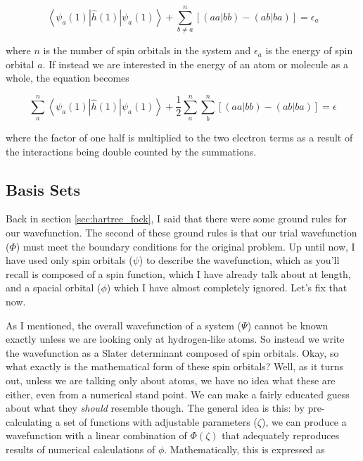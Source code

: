 \documentclass[12pt]{report}
\begin{document}
 \begin{equation}
\label{eq:hartree-fock_eq}
\left<\psi_{a}(1)|\hat{h}(1)|\psi_{a}(1)\right> + \sum^{n}_{b\neq a}\left[\left(aa|bb\right) - \left(ab|ba\right)\right] = \epsilon_{a}
\end{equation}

where $n$ is the number of spin orbitals in the system and $\epsilon_{a}$ is the energy of spin orbital $a$. If instead we are interested in the energy of an atom or molecule as a whole, the equation becomes

 \begin{equation}
\label{eq:hartree-fock_eq}
\sum_{a}^{n}\left<\psi_{a}(1)|\hat{h}(1)|\psi_{a}(1)\right> + \frac{1}{2}\sum^{n}_{a}\sum^{n}_{b}\left[\left(aa|bb\right) - \left(ab|ba\right)\right] = \epsilon
\end{equation}

where the factor of one half is multiplied to the two electron terms as a result of the interactions being double counted by the summations.

\subsection{Basis Sets}
Back in section \ref{sec:hartree_fock}, I said that there were some ground rules for our wavefunction. The second of these ground rules is that our trial wavefunction ($\Phi$) must meet the boundary conditions for the original problem. Up until now, I have used only spin orbitals ($\psi$) to describe the wavefunction, which as you'll recall is composed of a spin function, which I have already talk about at length, and a spacial orbital ($\phi$) which I have almost completely ignored. Let's fix that now. 

As I mentioned, the overall wavefunction of a system ($\Psi$) cannot be known exactly unless we are looking only at hydrogen-like atoms. So instead we write the wavefunction as a Slater determinant composed of spin orbitals. Okay, so what exactly is the mathematical form of these spin orbitals? Well, as it turns out, unless we are talking only about atoms, we have no idea what these are either, even from a numerical stand point. We can make a fairly educated guess about what they \textit{should} resemble though. The general idea is this: by pre-calculating a set of functions with adjustable parameters ($\zeta$), we can produce a wavefunction with a linear combination of $\Phi(\zeta)$ that adequately reproduces results of numerical calculations of $\phi$. Mathematically, this is expressed as
\end{document}
